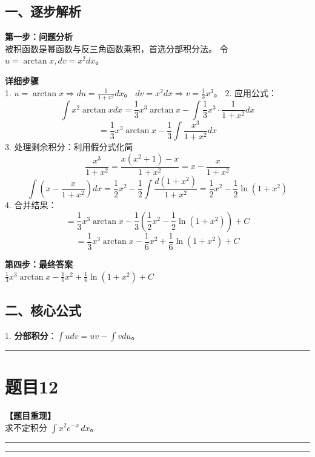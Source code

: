 \documentclass[12pt, a4paper]{ctexart}
\newcommand{\TopSeparator}{
    \par\noindent\rule{\textwidth}{1.5pt}\vspace{0.5em} %
}
\newcommand{\AnalysisSeparator}{
    \par\noindent\rule{\textwidth}{0.5pt}\vspace{0.2em}\hrule\vspace{0.5em} %
}
\newenvironment{RedAnalysis}{
    \par
    \color{red} %
}{
    \par
    \color{black} %
}
\begin{document}
\begin{RedAnalysis}

\subsection*{一、逐步解析}

\textbf{第一步：问题分析} \\
被积函数是幂函数与反三角函数乘积，首选分部积分法。
令 $u = \arctan x, dv = x^2 dx$。

\textbf{详细步骤} \\
1. $u = \arctan x \Rightarrow du = \frac{1}{1+x^2} dx$。
   $dv = x^2 dx \Rightarrow v = \frac{1}{3}x^3$。
2. 应用公式：
   \[ \int x^2 \arctan x dx = \frac{1}{3}x^3 \arctan x - \int \frac{1}{3}x^3 \cdot \frac{1}{1+x^2} dx \]
   \[ = \frac{1}{3}x^3 \arctan x - \frac{1}{3} \int \frac{x^3}{1+x^2} dx \]
3. 处理剩余积分：利用假分式化简
   \[ \frac{x^3}{1+x^2} = \frac{x(x^2+1)-x}{1+x^2} = x - \frac{x}{1+x^2} \]
   \[ \int (x - \frac{x}{1+x^2}) dx = \frac{1}{2}x^2 - \frac{1}{2}\int \frac{d(1+x^2)}{1+x^2} = \frac{1}{2}x^2 - \frac{1}{2}\ln(1+x^2) \]
4. 合并结果：
   \[ = \frac{1}{3}x^3 \arctan x - \frac{1}{3}(\frac{1}{2}x^2 - \frac{1}{2}\ln(1+x^2)) + C \]
   \[ = \frac{1}{3}x^3 \arctan x - \frac{1}{6}x^2 + \frac{1}{6}\ln(1+x^2) + C \]

\textbf{第四步：最终答案} \\
$ \frac{1}{3}x^3 \arctan x - \frac{1}{6}x^2 + \frac{1}{6}\ln(1+x^2) + C $

\subsection*{二、核心公式}
1. \textbf{分部积分}：$\int u dv = uv - \int v du$。

\end{RedAnalysis}

\vspace{2em}

\TopSeparator
\section*{题目12}

\textbf{【题目重现】} \\
求不定积分 $ \int x^{2}e^{-x} \, dx $。

\AnalysisSeparator
\end{document}
